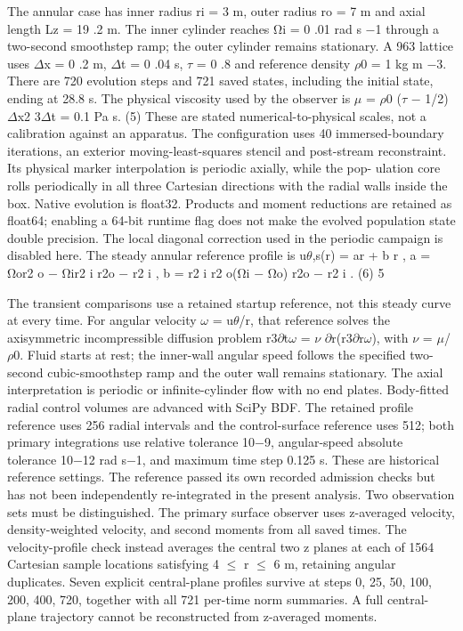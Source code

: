 \documentclass[11pt]{article}
\begin{document}
The annular case has inner radius ri = 3 m, outer radius ro = 7 m and axial length Lz = 19 .2 m.
The inner cylinder reaches Ωi = 0 .01 rad s \ensuremath{-}1 through a two-second smoothstep ramp; the outer
cylinder remains stationary. A 963 lattice uses \ensuremath{\Delta}x = 0 .2 m, \ensuremath{\Delta}t = 0 .04 s, \ensuremath{\tau} = 0 .8 and reference
density \ensuremath{\rho}0 = 1 kg m \ensuremath{-}3. There are 720 evolution steps and 721 saved states, including the initial
state, ending at 28.8 s. The physical viscosity used by the observer is
\ensuremath{\mu} = \ensuremath{\rho}0
(\ensuremath{\tau} \ensuremath{-} 1/2)\ensuremath{\Delta}x2
3\ensuremath{\Delta}t = 0.1 Pa s. (5)
These are stated numerical-to-physical scales, not a calibration against an apparatus.
The configuration uses 40 immersed-boundary iterations, an exterior moving-least-squares stencil
and post-stream reconstraint. Its physical marker interpolation is periodic axially, while the pop-
ulation core rolls periodically in all three Cartesian directions with the radial walls inside the box.
Native evolution is float32. Products and moment reductions are retained as float64; enabling a
64-bit runtime flag does not make the evolved population state double precision. The local diagonal
correction used in the periodic campaign is disabled here.
The steady annular reference profile is
u\ensuremath{\theta},s(r) = ar + b
r , a = Ωor2
o \ensuremath{-} Ωir2
i
r2o \ensuremath{-} r2
i
, b = r2
i r2
o(Ωi \ensuremath{-} Ωo)
r2o \ensuremath{-} r2
i
. (6)
5

The transient comparisons use a retained startup reference, not this steady curve at every time.
For angular velocity \ensuremath{\omega} = u\ensuremath{\theta}/r, that reference solves the axisymmetric incompressible diffusion
problem r3\ensuremath{\partial}t\ensuremath{\omega} = \ensuremath{\nu} \ensuremath{\partial}r(r3\ensuremath{\partial}r\ensuremath{\omega}), with \ensuremath{\nu} = \ensuremath{\mu}/\ensuremath{\rho}0. Fluid starts at rest; the inner-wall angular speed
follows the specified two-second cubic-smoothstep ramp and the outer wall remains stationary.
The axial interpretation is periodic or infinite-cylinder flow with no end plates. Body-fitted radial
control volumes are advanced with SciPy BDF. The retained profile reference uses 256 radial
intervals and the control-surface reference uses 512; both primary integrations use relative tolerance
10\ensuremath{-}9, angular-speed absolute tolerance 10\ensuremath{-}12 rad s\ensuremath{-}1, and maximum time step 0.125 s. These are
historical reference settings. The reference passed its own recorded admission checks but has not
been independently re-integrated in the present analysis.
Two observation sets must be distinguished. The primary surface observer uses z-averaged velocity,
density-weighted velocity, and second moments from all saved times. The velocity-profile check
instead averages the central two z planes at each of 1564 Cartesian sample locations satisfying
4 \ensuremath{\leq} r \ensuremath{\leq} 6 m, retaining angular duplicates. Seven explicit central-plane profiles survive at steps
0, 25, 50, 100, 200, 400, 720, together with all 721 per-time norm summaries. A full central-plane
trajectory cannot be reconstructed from z-averaged moments.
\end{document}
